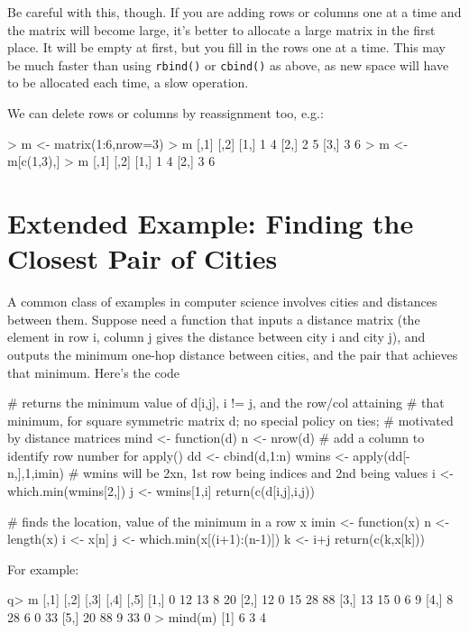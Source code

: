 Be careful with this, though.  If you are adding rows or columns one at
a time and the matrix will become large, it's better to allocate a large
matrix in the first place.  It will be empty at first, but you fill in
the rows one at a time.  This may be much faster than using {\tt rbind()}
or {\tt cbind()} as above, as new space will have to be allocated each
time, a slow operation.

We can delete rows or columns by reassignment too, e.g.:

\begin{Code}
> m <- matrix(1:6,nrow=3)
> m
     [,1] [,2]
[1,]    1    4
[2,]    2    5
[3,]    3    6
> m <- m[c(1,3),]
> m
     [,1] [,2]
[1,]    1    4
[2,]    3    6
\end{Code}

\section{Extended Example:  Finding the Closest Pair of Cities}
\label{cities}

A common class of examples in computer science involves cities and
distances between them.  Suppose need a function that inputs a distance
matrix (the element in row i, column j gives the distance between city i
and city j), and outputs the minimum one-hop distance between cities,
and the pair that achieves that minimum.  Here's the code

\begin{Code}
# returns the minimum value of d[i,j], i != j, and the row/col attaining
# that minimum, for square symmetric matrix d; no special policy on ties;
# motivated by distance matrices
mind <- function(d) {
   n <- nrow(d)
   # add a column to identify row number for apply()
   dd <- cbind(d,1:n)
   wmins <- apply(dd[-n,],1,imin)  
   # wmins will be 2xn, 1st row being indices and 2nd being values
   i <- which.min(wmins[2,])
   j <- wmins[1,i]
   return(c(d[i,j],i,j))
}

# finds the location, value of the minimum in a row x
imin <- function(x) {
   n <- length(x) 
   i <- x[n]
   j <- which.min(x[(i+1):(n-1)])
   k <- i+j
   return(c(k,x[k]))
}
\end{Code}

For example:

\begin{Code}
q> m
     [,1] [,2] [,3] [,4] [,5]
[1,]    0   12   13    8   20
[2,]   12    0   15   28   88
[3,]   13   15    0    6    9
[4,]    8   28    6    0   33
[5,]   20   88    9   33    0
> mind(m)
[1] 6 3 4
\end{Code}


